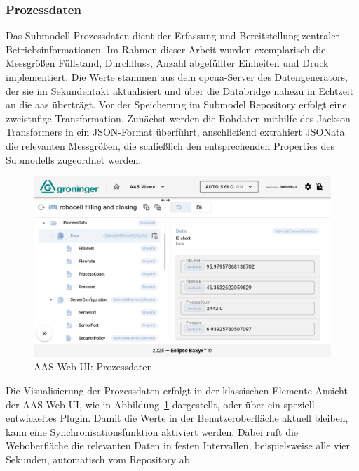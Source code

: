 \subsubsection*{Prozessdaten}

Das Submodell Prozessdaten dient der Erfassung und Bereitstellung zentraler Betriebsinformationen.
Im Rahmen dieser Arbeit wurden exemplarisch die Messgrößen Füllstand, Durchfluss, Anzahl abgefüllter Einheiten und Druck implementiert.
Die Werte stammen aus dem \acs{opcua}-Server des Datengenerators, der sie im Sekundentakt aktualisiert und über die Databridge nahezu in Echtzeit an die \acs{aas} überträgt.
Vor der Speicherung im Submodel Repository erfolgt eine zweistufige Transformation.
Zunächst werden die Rohdaten mithilfe des Jackson-Transformers in ein JSON-Format überführt, anschließend extrahiert JSONata die relevanten Messgrößen, die schließlich den entsprechenden Properties des Submodells zugeordnet werden.

\begin{figure}[htbp]
    \centering
    \includegraphics[width=1\textwidth]{Bilder/ErgebnisseAASWebUI/ProcessData.png}
    \caption{AAS Web UI: Prozessdaten}
    \label{fig:Processdata}
\end{figure}
\vspace{-0.5em}

Die Visualisierung der Prozessdaten erfolgt in der klassischen Elemente-Ansicht der AAS Web UI, wie in Abbildung~\ref{fig:Processdata} dargestellt, oder über ein speziell entwickeltes Plugin.
Damit die Werte in der Benutzeroberfläche aktuell bleiben, kann eine Synchronisationsfunktion aktiviert werden.
Dabei ruft die Weboberfläche die relevanten Daten in festen Intervallen, beispielsweise alle vier Sekunden, automatisch vom Repository ab.

